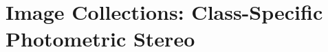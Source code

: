 \chapter{Image Collections: Class-Specific Photometric Stereo}\label{ch:imag_coll}
\minitoc{}


\stopcontents[chapters]
